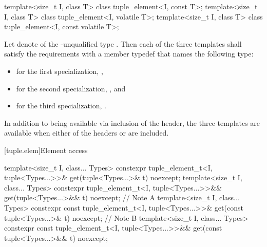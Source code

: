 %
\begin{itemdecl}
template<size_t I, class T> class tuple_element<I, const T>;
template<size_t I, class T> class tuple_element<I, volatile T>;
template<size_t I, class T> class tuple_element<I, const volatile T>;
\end{itemdecl}

\begin{itemdescr}
\pnum
Let  denote  of the \cv-unqualified type . Then
each of the three templates shall satisfy the 
requirements with a member typedef  that names the following
type:

\begin{itemize}
\item
for the first specialization, ,
\item
for the second specialization, , and
\item
for the third specialization, .
\end{itemize}

\pnum
In addition to being available via inclusion of the  header,
the three templates are available when either of the headers  or
 are included.
\end{itemdescr}

[tuple.elem]{Element access}

%
\begin{itemdecl}
template<size_t I, class... Types>
  constexpr tuple_element_t<I, tuple<Types...>>&
    get(tuple<Types...>& t) noexcept;
template<size_t I, class... Types>
  constexpr tuple_element_t<I, tuple<Types...>>&&
    get(tuple<Types...>&& t) noexcept;        // Note A
template<size_t I, class... Types>
  constexpr const tuple_element_t<I, tuple<Types...>>&
    get(const tuple<Types...>& t) noexcept;   // Note B
template<size_t I, class... Types>
  constexpr const tuple_element_t<I, tuple<Types...>>&& get(const tuple<Types...>&& t) noexcept;
\end{itemdecl}

